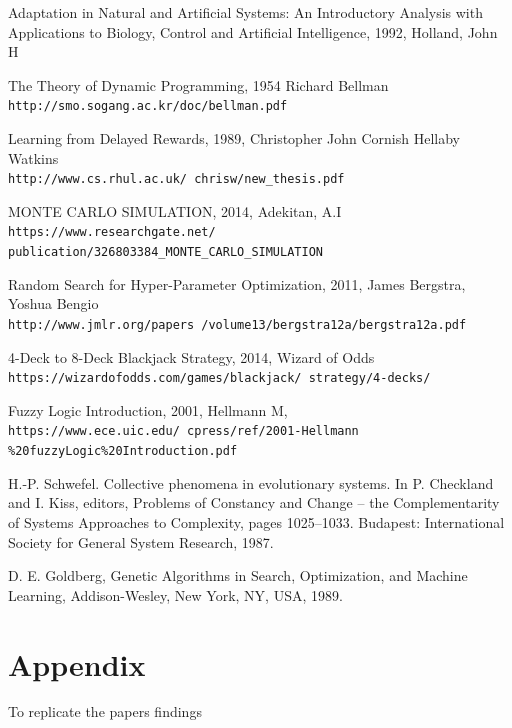 \documentclass[10pt, a4paper, twocolumn]{article}
\begin{document}
\begin{thebibliography}{4}

Adaptation in Natural and Artificial Systems: An Introductory Analysis with Applications to Biology, Control and Artificial Intelligence, 1992,
Holland, John H

The Theory of Dynamic Programming, 1954
Richard Bellman
\\\texttt{http://smo.sogang.ac.kr/doc/bellman.pdf }

Learning from Delayed Rewards, 1989,
Christopher John Cornish Hellaby Watkins
\\\texttt{http://www.cs.rhul.ac.uk/~chrisw/new\_thesis.pdf}

MONTE CARLO SIMULATION, 2014,
Adekitan, A.I
\\\texttt{https://www.researchgate.net/
publication/326803384\_MONTE\_CARLO\_SIMULATION}

Random Search for Hyper-Parameter Optimization, 2011, 
James Bergstra, Yoshua Bengio
\\\texttt{http://www.jmlr.org/papers
/volume13/bergstra12a/bergstra12a.pdf}

4-Deck to 8-Deck Blackjack Strategy, 2014,
Wizard of Odds
\\\texttt{https://wizardofodds.com/games/blackjack/
strategy/4-decks/}

Fuzzy Logic Introduction, 2001,
Hellmann M,
\\\texttt{https://www.ece.uic.edu/~cpress/ref/2001-Hellmann
\%20fuzzyLogic\%20Introduction.pdf}

 H.-P. Schwefel. Collective phenomena in evolutionary systems. In P. Checkland and I. Kiss,
editors, Problems of Constancy and Change –
the Complementarity of Systems Approaches to
Complexity, pages 1025–1033. Budapest: International Society for General System Research,
1987.

D. E. Goldberg, Genetic Algorithms in Search, Optimization, and Machine Learning, Addison-Wesley, New York, NY, USA, 1989.


\end{thebibliography}

\section{Appendix}

To replicate the papers findings
\end{document}
